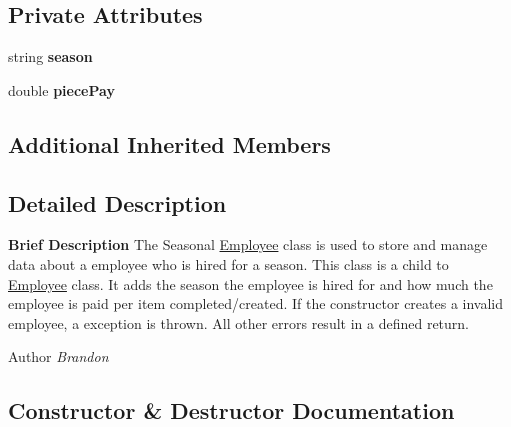 \subsection*{Private Attributes}
\begin{DoxyCompactItemize}
\item 
\hypertarget{class_all_employees_1_1_seasonal_employee_a7615ccd677faed6b26afa27aadd7a71e}{}string {\bfseries season}\label{class_all_employees_1_1_seasonal_employee_a7615ccd677faed6b26afa27aadd7a71e}

\item 
\hypertarget{class_all_employees_1_1_seasonal_employee_a9f315de9818cbcd7868b2d3a1a4452cc}{}double {\bfseries piece\+Pay}\label{class_all_employees_1_1_seasonal_employee_a9f315de9818cbcd7868b2d3a1a4452cc}

\end{DoxyCompactItemize}
\subsection*{Additional Inherited Members}


\subsection{Detailed Description}
{\bfseries Brief Description} The Seasonal \hyperlink{class_all_employees_1_1_employee}{Employee} class is used to store and manage data about a employee who is hired for a season. This class is a child to \hyperlink{class_all_employees_1_1_employee}{Employee} class. It adds the season the employee is hired for and how much the employee is paid per item completed/created. If the constructor creates a invalid employee, a exception is thrown. All other errors result in a defined return. 

\begin{DoxyAuthor}{Author}
{\itshape Brandon} 
\end{DoxyAuthor}


\subsection{Constructor \& Destructor Documentation}
\hypertarget{class_all_employees_1_1_seasonal_employee_a2206a19da96d42cbd56e7fb5d073c7d4}{}
